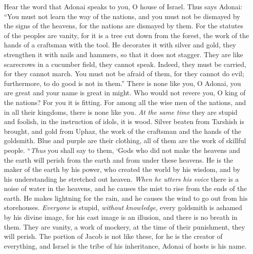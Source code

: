 \begin{biblechapter} %
\verse Hear the word that Adonai speaks to you, O house of Israel.
\verse Thus says Adonai:
\verse “You must not learn the way of the nations, 
and you must not be dismayed by the signs of the heavens, 
for the nations are dismayed by them.
\verse For the statutes of the peoples are vanity, 
for it is a tree cut down from the forest, 
the work of the hands of a craftsman with the tool.
\verse He decorates it with silver and gold, 
they strengthen it with nails and hammers, 
so that it does not stagger.
\verse They are like scarecrows in a cucumber field, 
they cannot speak. 
Indeed, they must be carried, 
for they cannot march. 
You must not be afraid of them, 
for they cannot do evil; 
furthermore, to do good is not in them.”
\verse There is none like you, O Adonai, 
you are great and your name is great in might.
\verse Who would not revere you, O king of the nations? 
For you it is fitting. 
For among all the wise men of the nations, 
and in all their kingdoms, 
there is none like you.
\verse \textit{At the same time} they are stupid and foolish, 
in the instruction of idols, it is wood.
\verse Silver beaten from Tarshish is brought, 
and gold from Uphaz, 
the work of the craftsman and the hands of the goldsmith. 
Blue and purple are their clothing, 
all of them are the work of skillful people.
\verse “\textit{Thus} you shall say to them,
\verse ‘Gods who did not make the heavens and the earth 
will perish from the earth and from under these heavens.
\verse He is the maker of the earth by his power, 
who created the world by his wisdom, 
and by his understanding he stretched out heaven.
\verse \textit{When he utters his voice} there is a noise of water in the heavens, 
and he causes the mist to rise from the ends of the earth. 
He makes lightning for the rain, 
and he causes the wind to go out from his storehouses.
\verse \textit{Everyone} is stupid, \textit{without knowledge}, 
every goldsmith is ashamed by his divine image, 
for his cast image is an illusion, 
and there is no breath in them.
\verse They are vanity, a work of mockery, 
at the time of their punishment, they will perish.
\verse The portion of Jacob is not like these, 
for he is the creator of everything, 
and Israel is the tribe of his inheritance, 
Adonai of hosts is his name.

\end{biblechapter}
